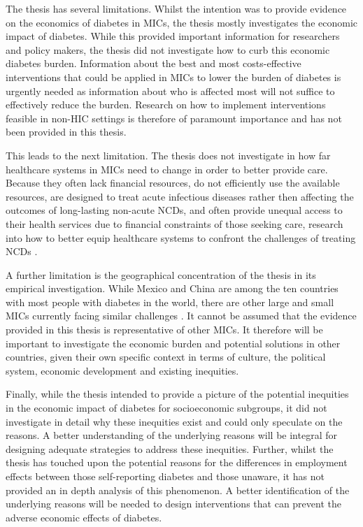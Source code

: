 The thesis has several limitations. Whilst the intention was to provide evidence on the economics of diabetes in \acp{MIC}, the thesis mostly investigates the economic impact of diabetes. While this provided important information for researchers and policy makers, the thesis did not investigate how to curb this economic diabetes burden. Information about the best and most costs-effective interventions that could be applied in \acp{MIC} to lower the burden of diabetes is urgently needed as information about who is affected most will not suffice to effectively reduce the burden. Research on how to implement interventions feasible in non-\ac{HIC} settings is therefore of paramount importance and has not been provided in this thesis.

This leads to the next limitation. The thesis does not investigate in how far healthcare systems in \acp{MIC} need to change in order to better provide care. Because they often lack financial resources, do not efficiently use the available resources, are designed to treat acute infectious diseases rather then affecting the outcomes of long-lasting non-acute \acp{NCD}, and often provide unequal access to their health services due to financial constraints of those seeking care, research into how to better equip healthcare systems to confront the challenges of treating \acp{NCD} \parencite{Mills2014,Guzman2010}.

A further limitation is the geographical concentration of the thesis in its empirical investigation. While Mexico and China are among the ten countries with most people with diabetes in the world, there are other large and small \acp{MIC} currently facing similar challenges \parencite{Risk2016}.  It cannot be assumed that the evidence provided in this thesis is representative of other \acp{MIC}. It therefore will be important to investigate the economic burden and potential solutions in other countries, given their own specific context in terms of culture, the political system, economic development and existing inequities.

Finally, while the thesis intended to provide a picture of the potential inequities in the economic impact of diabetes for socioeconomic subgroups, it did not investigate in detail why these inequities exist and could only speculate on the reasons. A better understanding of the underlying reasons will be integral for designing adequate strategies to address these inequities. Further, whilst the thesis has touched upon the potential reasons for the differences in employment effects between those self-reporting diabetes and those unaware, it has not provided an in depth analysis of this phenomenon. A better identification of the underlying reasons will be needed to design interventions that can prevent the adverse economic effects of diabetes. 



